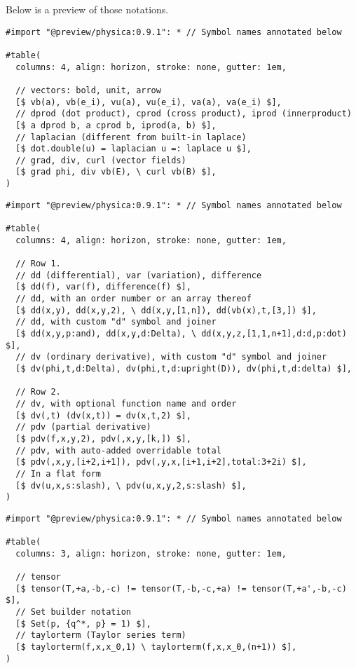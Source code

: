 Below is a preview of those notations.

\begin{verbatim}
#import "@preview/physica:0.9.1": * // Symbol names annotated below

#table(
  columns: 4, align: horizon, stroke: none, gutter: 1em,

  // vectors: bold, unit, arrow
  [$ vb(a), vb(e_i), vu(a), vu(e_i), va(a), va(e_i) $],
  // dprod (dot product), cprod (cross product), iprod (innerproduct)
  [$ a dprod b, a cprod b, iprod(a, b) $],
  // laplacian (different from built-in laplace)
  [$ dot.double(u) = laplacian u =: laplace u $],
  // grad, div, curl (vector fields)
  [$ grad phi, div vb(E), \ curl vb(B) $],
)
\end{verbatim}

\pandocbounded{}

\begin{verbatim}
#import "@preview/physica:0.9.1": * // Symbol names annotated below

#table(
  columns: 4, align: horizon, stroke: none, gutter: 1em,

  // Row 1.
  // dd (differential), var (variation), difference
  [$ dd(f), var(f), difference(f) $],
  // dd, with an order number or an array thereof
  [$ dd(x,y), dd(x,y,2), \ dd(x,y,[1,n]), dd(vb(x),t,[3,]) $],
  // dd, with custom "d" symbol and joiner
  [$ dd(x,y,p:and), dd(x,y,d:Delta), \ dd(x,y,z,[1,1,n+1],d:d,p:dot) $],
  // dv (ordinary derivative), with custom "d" symbol and joiner
  [$ dv(phi,t,d:Delta), dv(phi,t,d:upright(D)), dv(phi,t,d:delta) $],

  // Row 2.
  // dv, with optional function name and order
  [$ dv(,t) (dv(x,t)) = dv(x,t,2) $],
  // pdv (partial derivative)
  [$ pdv(f,x,y,2), pdv(,x,y,[k,]) $],
  // pdv, with auto-added overridable total
  [$ pdv(,x,y,[i+2,i+1]), pdv(,y,x,[i+1,i+2],total:3+2i) $],
  // In a flat form
  [$ dv(u,x,s:slash), \ pdv(u,x,y,2,s:slash) $],
)
\end{verbatim}

\pandocbounded{}

\begin{verbatim}
#import "@preview/physica:0.9.1": * // Symbol names annotated below

#table(
  columns: 3, align: horizon, stroke: none, gutter: 1em,

  // tensor
  [$ tensor(T,+a,-b,-c) != tensor(T,-b,-c,+a) != tensor(T,+a',-b,-c) $],
  // Set builder notation
  [$ Set(p, {q^*, p} = 1) $],
  // taylorterm (Taylor series term)
  [$ taylorterm(f,x,x_0,1) \ taylorterm(f,x,x_0,(n+1)) $],
)
\end{verbatim}

